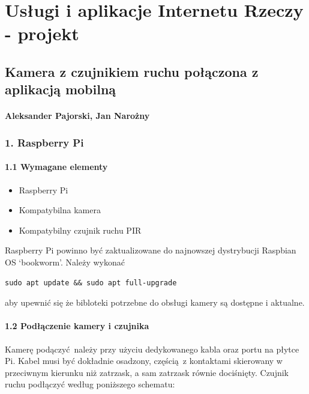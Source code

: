 \documentclass{article}
\begin{document}
\section{Usługi i aplikacje Internetu Rzeczy - projekt}

\subsection{Kamera z czujnikiem ruchu połączona z aplikacją mobilną}

\paragraph{Aleksander Pajorski, Jan
Narożny}

\subsubsection{1. Raspberry Pi}

\paragraph{1.1 Wymagane elementy}\label{wymagane-elementy}

\begin{itemize}
\item
  Raspberry Pi
\item
  Kompatybilna kamera
\item
  Kompatybilny czujnik ruchu PIR
\end{itemize}

Raspberry Pi powinno być zaktualizowane do najnowszej dystrybucji
Raspbian OS `bookworm'. Należy wykonać

\begin{verbatim}
sudo apt update && sudo apt full-upgrade
\end{verbatim}

aby upewnić się że bibloteki potrzebne do obsługi kamery są dostępne i
aktualne.

\paragraph{1.2 Podłączenie kamery i
czujnika}\label{podux142ux105czenie-kamery-i-czujnika}

Kamerę podączyć~należy przy użyciu dedykowanego kabla oraz portu na
płytce Pi. Kabel musi być dokładnie osadzony, częścią~z kontaktami
skierowany w przeciwnym kierunku niż zatrzask, a sam zatrzask równie
dociśnięty. Czujnik ruchu podłączyć według poniższego schematu:
\end{document}
